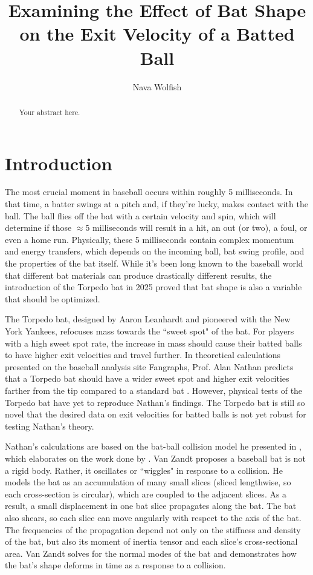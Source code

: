 \documentclass[linenumbers]{aastex7}
\begin{document}
\title{Examining the Effect of Bat Shape on the Exit Velocity of a Batted Ball}

\author{Nava Wolfish}

\begin{abstract}

Your abstract here.

\end{abstract}

\keywords{}

\section{Introduction}
The most crucial moment in baseball occurs within roughly 5 milliseconds. In that time, a batter swings at a pitch and, if they're lucky, makes contact with the ball. The ball flies off the bat with a certain velocity and spin, which will determine if those $\approx$5 milliseconds will result in a hit, an out (or two), a foul, or even a home run. Physically, these 5 milliseconds contain complex momentum and energy transfers, which depends on the incoming ball, bat swing profile, and the properties of the bat itself. While it's been long known to the baseball world that different bat materials can produce drastically different results, the introduction of the Torpedo bat in 2025 proved that bat shape is also a variable that should be optimized.

The Torpedo bat, designed by Aaron Leanhardt and pioneered with the New York Yankees, refocuses mass towards the ``sweet spot" of the bat. For players with a high sweet spot rate, the increase in mass should cause their batted balls to have higher exit velocities and travel further. In theoretical calculations presented on the baseball analysis site Fangraphs, Prof. Alan Nathan predicts that a Torpedo bat should have a wider sweet spot and higher exit velocities farther from the tip compared to a standard bat \citep{nathanPhysicsTorpedoBat2025}. However, physical tests of the Torpedo bat have yet to reproduce Nathan's findings. The Torpedo bat is still so novel that the desired data on exit velocities for batted balls is not yet robust for testing Nathan's theory. 

Nathan's calculations are based on the bat-ball collision model he presented in \cite{nathanDynamicsBaseballBat2000a}, which elaborates on the work done by \cite{zandt}. Van Zandt proposes a baseball bat is not a rigid body. Rather, it oscillates or ``wiggles" in response to a collision. He models the bat as an accumulation of many small slices (sliced lengthwise, so each cross-section is circular), which are coupled to the adjacent slices. As a result, a small displacement in one bat slice propagates along the bat. The bat also shears, so each slice can move angularly with respect to the axis of the bat. The frequencies of the propagation depend not only on the stiffness and density of the bat, but also its moment of inertia tensor and each slice's cross-sectional area. Van Zandt solves for the normal modes of the bat and demonstrates how the bat's shape deforms in time as a response to a collision. 
\end{document}
